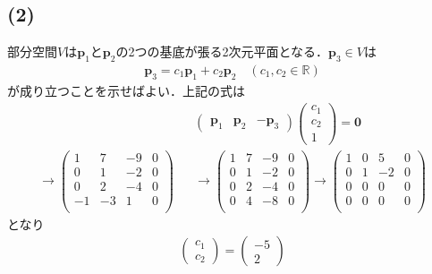 \documentclass[11pt, titlepage]{jsarticle}
\begin{document}
\subsection*{(2)}
部分空間$V$は$\boldsymbol p_1$と$\boldsymbol p_2$の2つの基底が張る2次元平面となる．$\boldsymbol p_3 \in V$は
\begin{eqnarray*}
  \boldsymbol p_3 = c_1 \boldsymbol p_1 + c_2 \boldsymbol p_2 \quad (c_1, c_2 \in \mathbb R)
\end{eqnarray*}
が成り立つことを示せばよい．上記の式は
\begin{eqnarray*}
  &&\begin{pmatrix}
    \boldsymbol p_1 & \boldsymbol p_2 & -\boldsymbol p_3
  \end{pmatrix}\begin{pmatrix}
    c_1 \\
    c_2 \\
    1
  \end{pmatrix}=\boldsymbol 0\\
  \rightarrow \left(\begin{array}{ccc|c}
    1  & 7  & -9 & 0 \\
    0  & 1  & -2 & 0 \\
    0  & 2  & -4 & 0 \\
    -1 & -3 & 1  & 0 \\
  \end{array}\right)&&
  \rightarrow\left(\begin{array}{ccc|c}
    1 & 7 & -9 & 0 \\
    0 & 1 & -2 & 0 \\
    0 & 2 & -4 & 0 \\
    0 & 4 & -8 & 0 \\
  \end{array}\right)
  \rightarrow\left(\begin{array}{ccc|c}
    1 & 0 & 5  & 0 \\
    0 & 1 & -2 & 0 \\
    0 & 0 & 0  & 0 \\
    0 & 0 & 0  & 0 \\
  \end{array}\right)
\end{eqnarray*}
となり
\begin{eqnarray*}
  \begin{pmatrix}
    c_1 \\
    c_2
  \end{pmatrix}=\begin{pmatrix}
    -5 \\
    2
  \end{pmatrix}
\end{eqnarray*}
\end{document}
